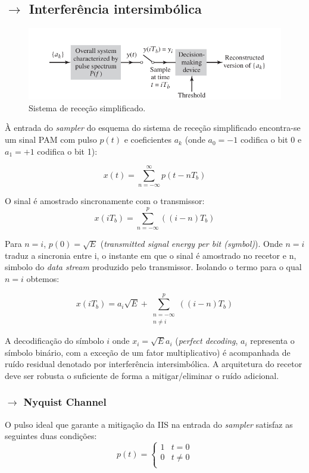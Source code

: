 \clearpage
\subsection[3.4 Interferência intersimbólica]{$\rightarrow$ Interferência intersimbólica}
\label{subsec:intersymbol-interference}

\begin{figure}[H]
    \centering
    \includegraphics[width = 0.8\linewidth]{img/digital/ISI/Receiver.png}
    \caption{Sistema de receção simplificado.}
    \label{fig:recetor}
\end{figure}

À entrada do \textit{sampler} do esquema do sistema de receção simplificado encontra-se um sinal PAM com pulso $p(t)$ e coeficientes $a_k$ (onde $a_0 = -1$ codifica o bit 0 e $a_1 = +1$ codifica o bit 1):

$$
    x(t) = \sum_{n = -\infty}^{\infty}p(t - n T_b)
$$

\noindent O sinal é amostrado sincronamente com o transmissor:
$$
    x(i T_b) = \sum_{n = -\infty}^p((i - n)T_b)
$$

\noindent Para $n = i$, $p(0) = \sqrt{E}$ (\textit{transmitted signal energy per bit (symbol)}). Onde $n = i$ traduz a sincronia entre i, o instante em que o sinal é amostrado no recetor e n, simbolo do \textit{data stream} produzido pelo transmissor. Isolando o termo para o qual $n = i$ obtemos:

$$
    \boxed{x(i T_b) = a_i\sqrt{E} + \sum_{\substack{n = -\infty\\
                                        n \neq i}}^p((i - n)T_b)}
$$

\noindent A decodificação do símbolo $i$ onde $x_i = \sqrt{E}a_i$ (\textit{perfect decoding}, $a_i$ representa o símbolo binário, com a exceção de um fator multiplicativo) é acompanhada de ruído residual denotado por interferência intersimbólica. A arquitetura do recetor deve ser robusta o suficiente de forma a mitigar/eliminar o ruído adicional.

\subsubsection[3.4.1 Critério de Nyquist]{$\rightarrow$ Nyquist Channel}
\label{subsec:NyqCriterion}
O pulso ideal que garante a mitigação da IIS na entrada do \textit{sampler} satisfaz as seguintes duas condições:
$$
    p(t) = \begin{cases}
        1 & t = 0\\
        0 & t \neq 0\\
    \end{cases}
$$

